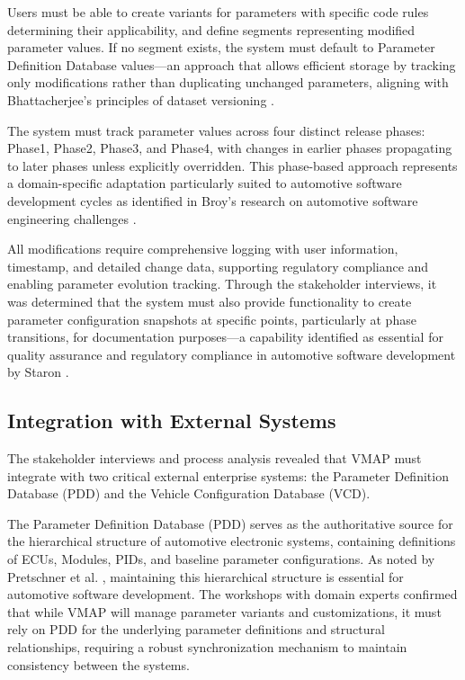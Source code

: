 Users must be able to create variants for parameters with specific code rules determining their applicability, and define segments representing modified parameter values. If no segment exists, the system must default to Parameter Definition Database values—an approach that allows efficient storage by tracking only modifications rather than duplicating unchanged parameters, aligning with Bhattacherjee's principles of dataset versioning \cite{bhattacherjee2015principles}.

The system must track parameter values across four distinct release phases: Phase1, Phase2, Phase3, and Phase4, with changes in earlier phases propagating to later phases unless explicitly overridden. This phase-based approach represents a domain-specific adaptation particularly suited to automotive software development cycles as identified in Broy's research on automotive software engineering challenges \cite{broy2006challenges}.

All modifications require comprehensive logging with user information, timestamp, and detailed change data, supporting regulatory compliance and enabling parameter evolution tracking. Through the stakeholder interviews, it was determined that the system must also provide functionality to create parameter configuration snapshots at specific points, particularly at phase transitions, for documentation purposes—a capability identified as essential for quality assurance and regulatory compliance in automotive software development by Staron \cite{staron2021automotive}.

\subsection{Integration with External Systems}
\label{subsec:integration-external-systems}

The stakeholder interviews and process analysis revealed that VMAP must integrate with two critical external enterprise systems: the Parameter Definition Database (PDD) and the Vehicle Configuration Database (VCD).

The Parameter Definition Database (PDD) serves as the authoritative source for the hierarchical structure of automotive electronic systems, containing definitions of ECUs, Modules, PIDs, and baseline parameter configurations. As noted by Pretschner et al. \cite{pretschner2007software}, maintaining this hierarchical structure is essential for automotive software development. The workshops with domain experts confirmed that while VMAP will manage parameter variants and customizations, it must rely on PDD for the underlying parameter definitions and structural relationships, requiring a robust synchronization mechanism to maintain consistency between the systems.

